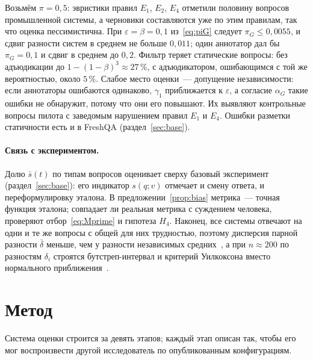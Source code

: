 \documentclass{article}
\begin{document}
Возьмём $\pi=0{,}5$: эвристики правил $E_1$, $E_2$, $E_4$ отметили половину вопросов промышленной системы, а черновики составляются уже по этим правилам, так что оценка пессимистична. При $\varepsilon=\beta=0{,}1$ из~\eqref{eq:piG} следует $\pi_G\le0{,}0055$, и сдвиг разности систем в среднем не больше $0{,}011$; один аннотатор дал бы $\pi_G=0{,}1$ и сдвиг в среднем до $0{,}2$. Фильтр теряет статические вопросы: без адъюдикации до $1-(1-\beta)^3\approx27\,\%$, с адъюдикатором, ошибающимся с той же вероятностью, около $5\,\%$. Слабое место оценки~--- допущение независимости: если аннотаторы ошибаются одинаково, $\gamma_1$ приближается к $\varepsilon$, а согласие $\alpha_G$ такие ошибки не обнаружит, потому что они его повышают. Их выявляют контрольные вопросы пилота с заведомым нарушением правил $E_1$ и $E_4$. Ошибки разметки статичности есть и в FreshQA (раздел~\ref{sec:base}).

\paragraph{Связь с экспериментом.} Долю $\bar s(t)$ по типам вопросов оценивает сверху базовый эксперимент (раздел~\ref{sec:base}): его индикатор $s(q;v)$ отмечает и смену ответа, и переформулировку эталона. В предложении~\ref{prop:bias} метрика~--- точная функция эталона; совпадает ли реальная метрика с суждением человека, проверяют отбор~\eqref{eq:Mprime} и гипотеза $H_4$. Наконец, все системы отвечают на одни и те же вопросы с общей для них трудностью, поэтому дисперсия парной разности $\bar\delta$ меньше, чем у разности независимых средних~\cite{hull1993using}, а при $n\approx200$ по разностям $\delta_i$ строятся бутстреп-интервал и критерий Уилкоксона вместо нормального приближения~\cite{bowyer2025position}.

\section{Метод}\label{sec:method}

Система оценки строится за девять этапов; каждый этап описан так, чтобы его мог воспроизвести другой исследователь по опубликованным конфигурациям.
\end{document}
